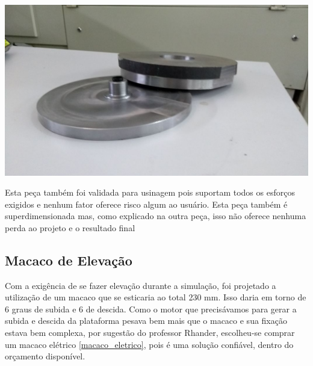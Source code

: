     \begin{center}
    	\includegraphics[scale=0.4]{figuras/mesa_giratoria_1}
        \label{mesa_giratoria_1}
    \end{center}

    Esta peça também foi validada para usinagem pois suportam todos os esforços exigidos e nenhum fator oferece risco algum ao usuário. Esta peça também é superdimensionada mas, como explicado na outra peça, isso não oferece nenhuma perda ao projeto e o resultado final

\subsection{Macaco de Elevação}

    Com a exigência de se fazer elevação durante a simulação, foi projetado a utilização de um macaco que se esticaria ao total 230 mm. Isso daria em torno de 6 graus de subida e 6 de descida. Como o motor que precisávamos para gerar a subida e descida da plataforma pesava bem mais que o macaco e sua fixação estava bem complexa, por sugestão do professor Rhander, escolheu-se comprar um macaco elétrico \ref{macaco_eletrico}, pois é uma solução confiável, dentro do orçamento disponível.


